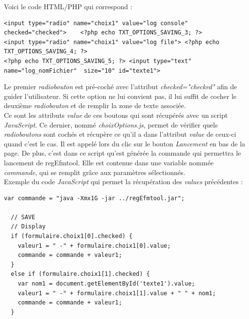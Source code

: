 Voici le code HTML/PHP qui correspond :

\scriptsize
\begin{DDbox}{\linewidth}
\begin{lstlisting}
<input type="radio" name="choix1" value="log console" checked="checked">	<?php echo TXT_OPTIONS_SAVING_3; ?> 
<input type="radio" name="choix1" value="log file"> <?php echo TXT_OPTIONS_SAVING_4; ?> 
<?php echo TXT_OPTIONS_SAVING_5; ?> <input type="text"	 name="log_nomFichier" 	size="10" id="texte1">
\end{lstlisting}
\end{DDbox}

\normalsize

Le premier \textit{radiobouton} est pré-coché avec l'attribut \textit{checked="checked"} afin de guider l'utilisateur. Si cette option ne lui convient pas, il lui suffit de cocher le deuxième \textit{radiobouton} et de remplir la zone de texte associée. \\

Ce sont les attributs \textit{value} de ces boutons qui sont récupérés avec un script \emph{JavaScript}. Ce dernier, nommé \emph{choixOptions.js}, permet de vérifier quels \textit{radioboutons} sont cochés et récupère ce qu'il a dans l'attribut \textit{value} de ceux-ci quand c'est le cas. Il est appelé lors du clic sur le bouton \textit{Lancement} en bas de la page. De plus, c'est dans ce script qu'est générée la commande qui permettra le lancement de regEfmtool. Elle est contenue dans une variable nommée  \textit{commande}, qui se remplit grâce aux paramètres sélectionnés. \\

Exemple du code \emph{JavaScript} qui permet la récupération des \textit{values} précédentes : \\

\begin{DDbox}{\linewidth}
\begin{lstlisting}
var commande = "java -Xmx1G -jar ../regEfmtool.jar";

  // SAVE
  // Display
  if (formulaire.choix1[0].checked) { 
    valeur1 = " -" + formulaire.choix1[0].value; 
    commande = commande + valeur1;
  }
  else if (formulaire.choix1[1].checked) { 
    var nom1 = document.getElementById('texte1').value;
    valeur1 = " -" + formulaire.choix1[1].value + " " + nom1; 
    commande = commande + valeur1;
  }
\end{lstlisting}
\end{DDbox}

